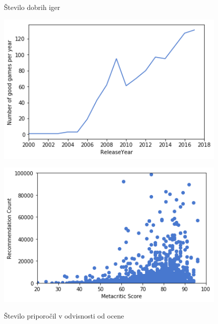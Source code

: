 \documentclass[a4paper]{article}
\begin{document}
\begin{figure}[h]
\begin{minipage}{0.45\textwidth}
			\label{fig:bad_n_year}
    \end{minipage}\hfill
		\begin{minipage}{0.45\textwidth}
			\centering
			\caption{Število dobrih iger \label{fig:good_n_year}}
			\includegraphics[width=1\textwidth,keepaspectratio]{graf_Dobre_leto.png}
    \end{minipage}
    \begin{minipage}{0.45\textwidth}
			\flushleft
				\caption{Število priporočil v odvisnosti od ocene}
			\includegraphics[width=1\textwidth,keepaspectratio]{graf_meta_rec.png}
			\label{fig:rec_meta}
    \end{minipage}\hfill
\end{figure}
\end{document}
